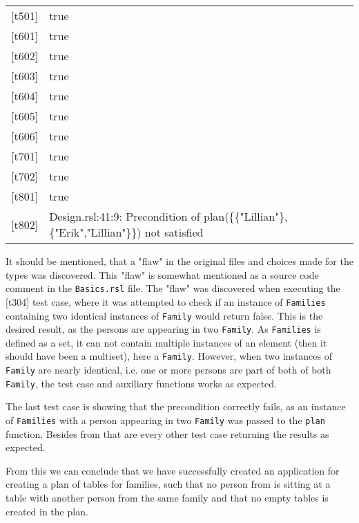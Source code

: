 \documentclass[a4]{article}
\begin{document}
\begin{table}[h]
\begin{tabular}{l|l}
{[}t501{]} & true                                                                                        \\
{[}t601{]} & true                                                                                        \\
{[}t602{]} & true                                                                                        \\
{[}t603{]} & true                                                                                        \\
{[}t604{]} & true                                                                                        \\
{[}t605{]} & true                                                                                        \\
{[}t606{]} & true                                                                                        \\
{[}t701{]} & true                                                                                        \\
{[}t702{]} & true                                                                                        \\
{[}t801{]} & true                                                                                        \\
{[}t802{]} & Design.rsl:41:9: Precondition of plan(\{\{"Lillian"\},\{"Erik","Lillian"\}\}) not satisfied
\end{tabular}
\end{table}

It should be mentioned, that a "flaw" in the original files and choices made for the types was discovered. This "flaw" is somewhat mentioned as a source code comment in the \verb=Basics.rsl= file. The "flaw" was discovered when executing the {[}t304{]} test case, where it was attempted to check if an instance of \verb=Families= containing two identical instances of \verb=Family= would return false. This is the desired result, as the persons are appearing in two \verb=Family=. As \verb=Families= is defined as a set, it can not contain multiple instances of an element (then it should have been a multiset), here a \verb=Family=. However, when two instances of \verb=Family= are nearly identical, i.e. one or more persons are part of both of both \verb=Family=, the test case and auxiliary functions works as expected.

The last test case is showing that the precondition correctly fails, as an instance of \verb=Families= with a person appearing in two \verb=Family= was passed to the \verb=plan= function. Besides from that are every other test case returning the results as expected.

\noindent From this we can conclude that we have successfully created an application for creating a plan of tables for families, such that no person from is sitting at a table with another person from the same family and that no empty tables is created in the plan.
\end{document}
